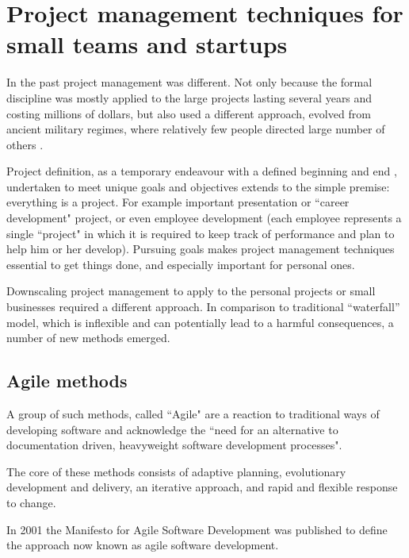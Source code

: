 \chapter{Project management techniques for small teams and startups}

In the past project management was different. Not only because the formal discipline was mostly applied to the large projects lasting several years and costing millions of dollars, but also used a different approach, evolved from ancient military regimes, where relatively few people directed large number of others \cite{brandon}.

Project definition, as a temporary endeavour with a defined beginning and end \cite{chatfield}, undertaken to meet unique goals and objectives \cite{nokes} extends to the simple premise: everything is a project. For example important presentation or ``career development" project, or even  employee development (each employee represents a single ``project" in which it is required to keep track of performance and plan to help him or her develop). Pursuing goals makes project management techniques essential to get things done, and especially important for personal ones.

Downscaling project management to apply to the personal projects or small businesses required a different approach. In comparison to traditional ``waterfall'' model, which is inflexible and can potentially lead to a harmful consequences, a number of new methods emerged.

\section{Agile methods}

A group of such methods, called ``Agile" are a reaction to traditional ways of developing software and acknowledge the ``need for an alternative to documentation driven, heavyweight software development processes".

The core of these methods consists of adaptive planning, evolutionary development and delivery, an iterative approach, and rapid and flexible response to change.

In 2001 the Manifesto for Agile Software Development \cite{agile-manifesto} was published to define the approach now known as agile software development. 

